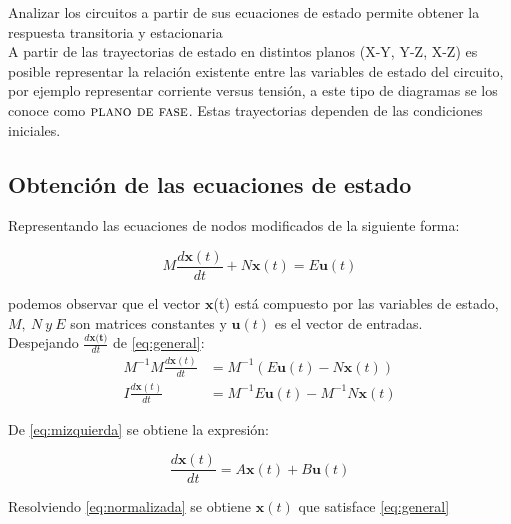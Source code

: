 \documentclass[10pt,a4paper]{article} %
\begin{document}
	Analizar los circuitos a partir de sus ecuaciones de estado permite obtener la respuesta transitoria y estacionaria\\
	
	A partir de las trayectorias de estado en distintos planos (X-Y, Y-Z, X-Z) es posible representar la relación existente entre las variables de estado del circuito, por ejemplo representar corriente versus tensión, a este tipo de diagramas se los conoce como $\textsc{plano de fase}$. Estas trayectorias dependen de las condiciones iniciales.	
	
	\subsection{Obtención de las ecuaciones de estado}
	
	Representando las ecuaciones de nodos modificados de la siguiente forma:
	
	\begin{equation}
		M\frac{d\textbf{x}(t)}{dt}+N\textbf{x}(t)=E\textbf{u}(t)\label{eq:general}
	\end{equation}
	
	
	podemos observar que el vector $\textbf{x}$(t) está compuesto por las variables de estado, $M,\ N\ y\ E$ son matrices constantes y $\textbf{u}(t)$ es el vector de entradas.\\
	
	Despejando $\frac{d\textbf{x(t)}}{dt}$ de \ref{eq:general}:
	\begin{align}
		M^{-1}M\frac{d\textbf{x}(t)}{dt}&=M^{-1}\left(E\textbf{u}(t)-N\textbf{x}(t)\right)\nonumber\\
		I\frac{d\textbf{x}(t)}{dt}&=M^{-1} E\textbf{u}(t)- M^{-1} N\textbf{x}(t)\label{eq:mizquierda}
	\end{align}
	
	De \ref{eq:mizquierda} se obtiene la expresión:
	
	\begin{equation}
		\frac{d\textbf{x}(t)}{dt}=A\textbf{x}(t)+B\textbf{u}(t) \label{eq:normalizada}
	\end{equation}
	
	Resolviendo \ref{eq:normalizada} se obtiene $\textbf{x}(t)$ que satisface \ref{eq:general}\\
	
\end{document}
